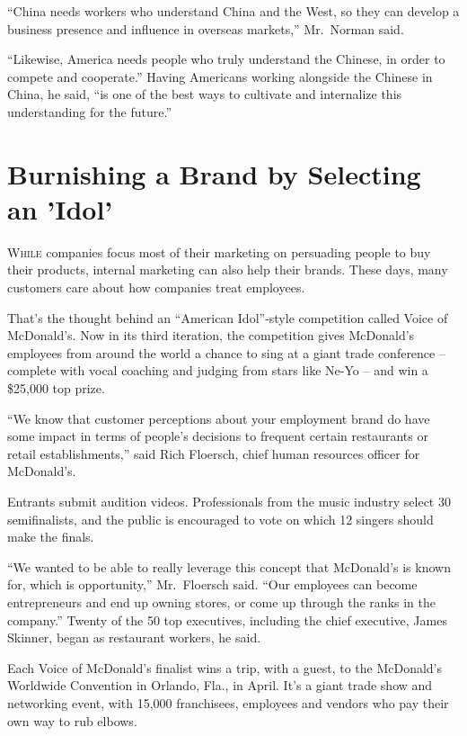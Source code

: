 ﻿\documentclass[12pt]{article}
\begin{document}
``China needs workers who understand China and the West, so they can develop a business presence and
influence in overseas markets,'' Mr.~Norman said.

``Likewise, America needs people who truly understand the Chinese, in order to compete and
cooperate.'' Having Americans working alongside the Chinese in China, he said, ``is one of the best
ways to cultivate and internalize this understanding for the future.''

\section{Burnishing a Brand by Selecting an 'Idol'}

\lettrine{W}{hile} companies focus most of their marketing on persuading
people to buy their products, internal marketing can also help their brands. These days, many
customers care about how companies treat employees.

That's the thought behind an ``American Idol''-style competition called Voice of McDonald's. Now in
its third iteration, the competition gives McDonald's employees from around the world a chance to
sing at a giant trade conference -- complete with vocal coaching and judging from stars like Ne-Yo
-- and win a \$25,000 top prize.

``We know that customer perceptions about your employment brand do have some impact in terms of
people's decisions to frequent certain restaurants or retail establishments,'' said Rich Floersch,
chief human resources officer for McDonald's.

Entrants submit audition videos. Professionals from the music industry select 30 semifinalists, and
the public is encouraged to vote on which 12 singers should make the finals.

``We wanted to be able to really leverage this concept that McDonald's is known for, which is
opportunity,'' Mr.~Floersch said. ``Our employees can become entrepreneurs and end up owning stores,
or come up through the ranks in the company.'' Twenty of the 50 top executives, including the chief
executive, James Skinner, began as restaurant workers, he said.

Each Voice of McDonald's finalist wins a trip, with a guest, to the McDonald's Worldwide Convention
in Orlando, Fla., in April. It's a giant trade show and networking event, with 15,000 franchisees,
employees and vendors who pay their own way to rub elbows.
\end{document}
